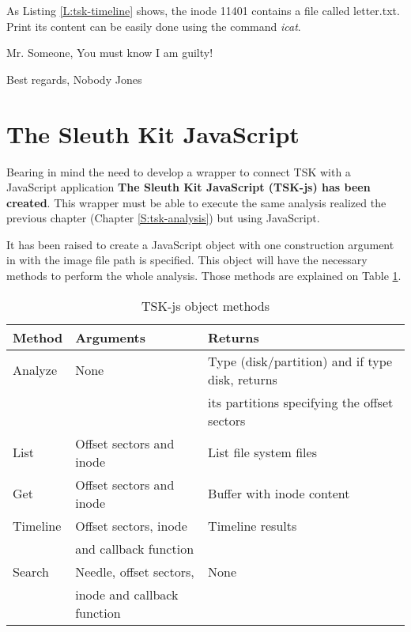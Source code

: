 As Listing \ref{L:tsk-timeline} shows, the inode 11401 contains a file called
letter.txt. Print its content can be easily done using the command
\textit{icat}. 


\begin{terminal}[caption=Export a file contained inside the file system,label=L:icat-export]
%
%
Mr. Someone,
You must know I am guilty!

Best regards,
Nobody Jones

\end{terminal}


\section{The Sleuth Kit JavaScript}


Bearing in mind the need to develop a wrapper to connect TSK with a JavaScript
application \textbf{The Sleuth Kit JavaScript (TSK-js) has been created}. This
wrapper must be able to execute the same analysis realized the previous chapter
(Chapter \ref{S:tsk-analysis}) but using JavaScript.

It has been raised to create a JavaScript object with one construction argument
in with the image file path is specified. This object will have the necessary
methods to perform the whole analysis. Those methods are explained on Table
\ref{T:tsk-js-object-methods}.

\begin{table}[htb]
\begin{center}
\begin{tabular}{|l|l|l|}
\hline
{\bf Method }	& {\bf Arguments} & {\bf Returns } \\ \hline \hline
Analyze	& None & Type (disk/partition) and if type disk, returns\\
& 	   & its partitions specifying the offset sectors \\ \hline
List & Offset sectors and inode & List file system files \\ \hline
Get & Offset sectors and inode & Buffer with inode content \\ \hline
Timeline & Offset sectors, inode & Timeline results \\ 
& and callback function & \\ \hline
Search & Needle, offset sectors, & None \\ 
& inode and callback function & \\ \hline
\end{tabular}
\caption{TSK-js object methods}
\label{T:tsk-js-object-methods}
\end{center}
\end{table}

